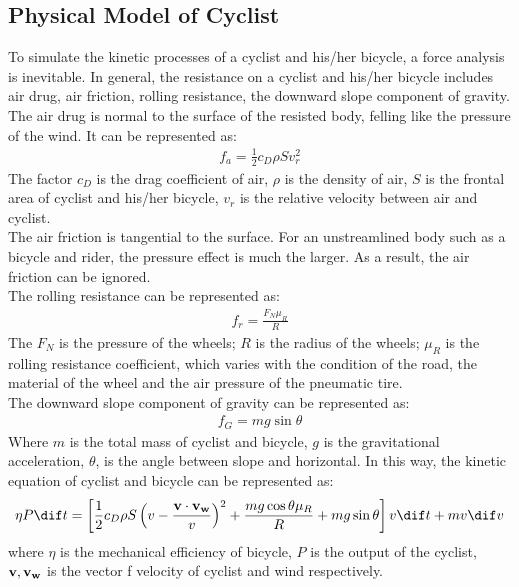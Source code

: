 \documentclass{mcmthesis}
\begin{document}
  \subsection{Physical Model of Cyclist}
  To simulate the kinetic processes of a cyclist and his/her bicycle, a force analysis is inevitable. In general, the resistance on a cyclist and his/her bicycle includes air drug, air friction, rolling resistance, the downward slope component of gravity. \\
  The air drug is normal to the surface of the resisted body, felling like the pressure of the wind. It can be represented as: 
  \begin{equation}
    \begin{aligned}
      f_{a} = \frac{1}{2} c_{D} \rho S v_{r} ^{2}
    \end{aligned}
  \end{equation}
  The factor $c_D$ is the drag coefficient of air, $\rho$ is the density of air, $S$ is the frontal area of cyclist and his/her bicycle, $v_{r}$ is the relative velocity between air and cyclist. \\
  The air friction is tangential to the surface. For an unstreamlined body such as a bicycle and rider, the pressure effect is much the larger. As a result, the air friction can be ignored.\\
  The rolling resistance can be represented as: 
  \begin{equation}
    \begin{aligned}
      f_{r} = \frac{F_{N} \mu_{R}}{R}
    \end{aligned}
  \end{equation}
  The $F_{N}$ is the pressure of the wheels; $R$ is the radius of the wheels; $\mu_{R}$ is the rolling resistance coefficient, which varies with the condition of the road, the material of the wheel and the air pressure of the pneumatic tire. \\
  The downward slope component of gravity can be represented as: 
  \begin{equation}
    \begin{aligned}
      f_{G} = mg\sin \theta
    \end{aligned}
  \end{equation}
  Where $m$ is the total mass of cyclist and bicycle, $g$ is the gravitational acceleration, $\theta$, is the angle between slope and horizontal. 
  In this way, the kinetic equation of cyclist and bicycle can be represented as:
  \begin{equation}
    \begin{aligned}
      \eta P \dif t = \left[ \frac{1}{2} c_{D} \rho S \left(v - \frac{{\bf v\cdot v_{w}}}{v}\right)^{2} + \frac{mg\cos \theta \mu_{R}}{R} + mg\sin \theta \right]v\dif t + mv \dif v
    \end{aligned}
  \end{equation}
  where $\eta$ is the mechanical efficiency of bicycle, $P$ is the output of the cyclist, ${\bf v,v_{w}}$ is the vector f velocity of cyclist and wind respectively.

  
\end{document}
